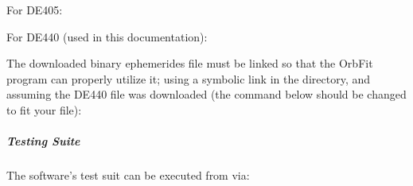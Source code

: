 \documentclass[letterpaper,11pt,english]{sphinxmanual}
\begin{document}
\sphinxAtStartPar
For DE405:

\begin{sphinxVerbatim}[commandchars=\\\{\}]
  
\end{sphinxVerbatim}

\sphinxAtStartPar
For DE440 (used in this documentation):

\begin{sphinxVerbatim}[commandchars=\\\{\}]
  
\end{sphinxVerbatim}

\sphinxAtStartPar
The downloaded binary ephemerides file must be linked so that the OrbFit
program can properly utilize it; using a symbolic link in the
 directory, and assuming the DE440 file was downloaded (the
command below should be changed to fit your file):

\begin{sphinxVerbatim}[commandchars=\\\{\}]
 
   
 
\end{sphinxVerbatim}


\subparagraph{Testing Suite}
\label{\detokenize{technical/installation/orbfit:testing-suite}}
\sphinxAtStartPar
The software’s test suit can be executed from  via:

\begin{sphinxVerbatim}[commandchars=\\\{\}]
 
\end{sphinxVerbatim}
\end{document}
